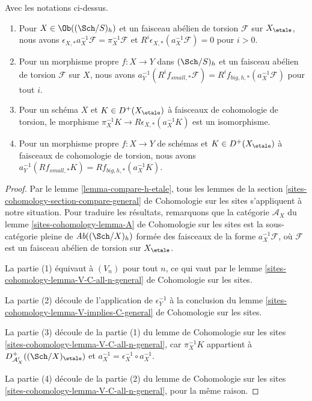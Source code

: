 \begin{lemma}
\label{lemma-V-C-all-n-etale-h}
Avec les notations ci-dessus.
\begin{enumerate}
\item Pour $X \in \Ob((\Sch/S)_{h})$ et un faisceau abélien de torsion $\mathcal{F}$
sur $X_\etale$, nous avons
$\epsilon_{X, *}a_X^{-1}\mathcal{F} = \pi_X^{-1}\mathcal{F}$
et $R^i\epsilon_{X, *}(a_X^{-1}\mathcal{F}) = 0$ pour $i > 0$.
\item Pour un morphisme propre $f : X \to Y$ dans $(\Sch/S)_h$
et un faisceau abélien de torsion $\mathcal{F}$ sur $X$, nous avons
$a_Y^{-1}(R^if_{small, *}\mathcal{F}) =
R^if_{big, h, *}(a_X^{-1}\mathcal{F})$
pour tout $i$.
\item Pour un schéma $X$ et $K \in D^+(X_\etale)$ à faisceaux de
cohomologie de torsion, le morphisme
$\pi_X^{-1}K \to R\epsilon_{X, *}(a_X^{-1}K)$ est un isomorphisme.
\item Pour un morphisme propre $f : X \to Y$ de schémas
et $K \in D^+(X_\etale)$ à faisceaux de cohomologie de torsion, nous avons
$a_Y^{-1}(Rf_{small, *}K) = Rf_{big, h, *}(a_X^{-1}K)$.
\end{enumerate}
\end{lemma}

\begin{proof}
Par le lemme \ref{lemma-compare-h-etale}, tous les lemmes de la
section \ref{sites-cohomology-section-compare-general} de Cohomologie sur les sites
s'appliquent à notre situation. Pour traduire les résultats,
remarquons que la catégorie $\mathcal{A}_X$ du
lemme \ref{sites-cohomology-lemma-A} de Cohomologie sur les sites
est la sous-catégorie pleine de $\textit{Ab}((\Sch/X)_h)$
formée des faisceaux de la forme $a_X^{-1}\mathcal{F}$,
où $\mathcal{F}$ est un faisceau abélien de torsion sur $X_\etale$.

\medskip\noindent
La partie (1) équivaut à $(V_n)$ pour tout $n$, ce qui vaut par le
lemme \ref{sites-cohomology-lemma-V-C-all-n-general} de Cohomologie sur les sites.

\medskip\noindent
La partie (2) découle de l'application de $\epsilon_Y^{-1}$ à la conclusion du
lemme \ref{sites-cohomology-lemma-V-implies-C-general} de Cohomologie sur les sites.

\medskip\noindent
La partie (3) découle de la partie (1) du lemme de Cohomologie sur les sites
\ref{sites-cohomology-lemma-V-C-all-n-general},
car $\pi_X^{-1}K$ appartient à $D^+_{\mathcal{A}'_X}((\Sch/X)_\etale)$
et $a_X^{-1} = \epsilon_X^{-1} \circ a_X^{-1}$.

\medskip\noindent
La partie (4) découle de la partie (2) du lemme de Cohomologie sur les sites
\ref{sites-cohomology-lemma-V-C-all-n-general},
pour la même raison.
\end{proof}


